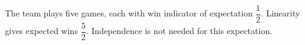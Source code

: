 The team plays five games, each with win indicator of expectation $\dfrac{1}{2}$. Linearity gives expected wins $\boxed{\dfrac{5}{2}}$. Independence is not needed for this expectation.
